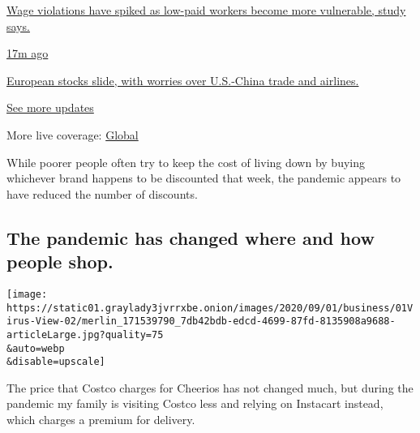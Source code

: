 \href{https://www.nytimes3xbfgragh.onion/live/2020/09/08/business/stock-market-today-coronavirus?action=click\&pgtype=Article\&state=default\&region=MAIN_CONTENT_1\&context=storylines_live_updates\#wage-violations-have-spiked-as-low-paid-workers-become-more-vulnerable-study-says}{Wage
violations have spiked as low-paid workers become more vulnerable, study
says.}

\href{https://www.nytimes3xbfgragh.onion/live/2020/09/08/business/stock-market-today-coronavirus?action=click\&pgtype=Article\&state=default\&region=MAIN_CONTENT_1\&context=storylines_live_updates\#european-stocks-slide-with-worries-over-us-china-trade-and-airlines}{17m
ago}

\href{https://www.nytimes3xbfgragh.onion/live/2020/09/08/business/stock-market-today-coronavirus?action=click\&pgtype=Article\&state=default\&region=MAIN_CONTENT_1\&context=storylines_live_updates\#european-stocks-slide-with-worries-over-us-china-trade-and-airlines}{European
stocks slide, with worries over U.S.-China trade and airlines.}

\href{https://www.nytimes3xbfgragh.onion/live/2020/09/08/business/stock-market-today-coronavirus?action=click\&pgtype=Article\&state=default\&region=MAIN_CONTENT_1\&context=storylines_live_updates}{See
more updates}

More live coverage:
\href{https://www.nytimes3xbfgragh.onion/2020/09/08/world/covid-19-coronavirus.html?action=click\&pgtype=Article\&state=default\&region=MAIN_CONTENT_1\&context=storylines_live_updates}{Global}

While poorer people often try to keep the cost of living down by buying
whichever brand happens to be discounted that week, the pandemic appears
to have reduced the number of discounts.

\hypertarget{the-pandemic-has-changed-where-and-how-people-shop}{%
\subsection{The pandemic has changed where and how people
shop.}\label{the-pandemic-has-changed-where-and-how-people-shop}}

\texttt{[image: https://static01.graylady3jvrrxbe.onion/images/2020/09/01/business/01Virus-View-02/merlin\_171539790\_7db42bdb-edcd-4699-87fd-8135908a9688-articleLarge.jpg?quality=75\\\&auto=webp\\\&disable=upscale]}

The price that Costco charges for Cheerios has not changed much, but
during the pandemic my family is visiting Costco less and relying on
Instacart instead, which charges a premium for delivery.

